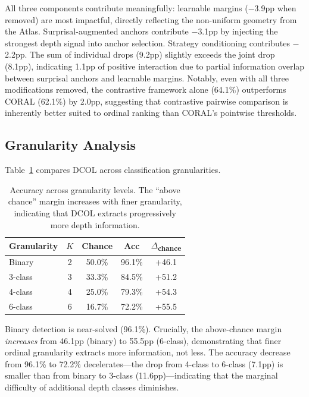 \documentclass[11pt,a4paper]{article}
\newcommand{\ours}{DCOL}
\newcommand{\atlas}{Atlas}
\begin{document}
All three components contribute meaningfully: learnable margins ($-$3.9pp when removed) are most impactful, directly reflecting the non-uniform geometry from the \atlas{}. Surprisal-augmented anchors contribute $-$3.1pp by injecting the strongest depth signal into anchor selection. Strategy conditioning contributes $-$2.2pp. The sum of individual drops (9.2pp) slightly exceeds the joint drop (8.1pp), indicating 1.1pp of positive interaction due to partial information overlap between surprisal anchors and learnable margins. Notably, even with all three modifications removed, the contrastive framework alone (64.1\%) outperforms CORAL (62.1\%) by 2.0pp, suggesting that contrastive pairwise comparison is inherently better suited to ordinal ranking than CORAL's pointwise thresholds.

\subsection{Granularity Analysis}
\label{sec:granularity}

Table~\ref{tab:granularity} compares \ours{} across classification granularities.

\begin{table}[t]
\centering
\small
\begin{tabular}{lcccc}
\toprule
\textbf{Granularity} & \textbf{$K$} & \textbf{Chance} & \textbf{Acc} & \textbf{$\Delta$\textsubscript{chance}} \\
\midrule
Binary          & 2 & 50.0\% & 96.1\% & +46.1 \\
3-class         & 3 & 33.3\% & 84.5\% & +51.2 \\
4-class         & 4 & 25.0\% & 79.3\% & +54.3 \\
6-class         & 6 & 16.7\% & 72.2\% & +55.5 \\
\bottomrule
\end{tabular}
\caption{Accuracy across granularity levels. The ``above chance'' margin increases with finer granularity, indicating that \ours{} extracts progressively more depth information.}
\label{tab:granularity}
\end{table}

Binary detection is near-solved (96.1\%). Crucially, the above-chance margin \emph{increases} from 46.1pp (binary) to 55.5pp (6-class), demonstrating that finer ordinal granularity extracts more information, not less. The accuracy decrease from 96.1\% to 72.2\% decelerates---the drop from 4-class to 6-class (7.1pp) is smaller than from binary to 3-class (11.6pp)---indicating that the marginal difficulty of additional depth classes diminishes.
\end{document}
